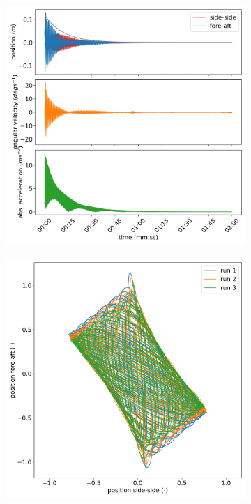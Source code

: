 \documentclass{article}
\begin{document}
\begin{figure}[ht!]

    \centering
    \begin{subfigure}[b]{0.45\textwidth}
        \centering
        \includegraphics[width=\textwidth]{figures/low_mass_acceleration.png}
    \end{subfigure}
    \begin{subfigure}[b]{0.45\textwidth}
        \centering
        \includegraphics[width=\textwidth]{figures/low_mass_orbit.png}
    \end{subfigure}
    

\end{figure}
\end{document}
